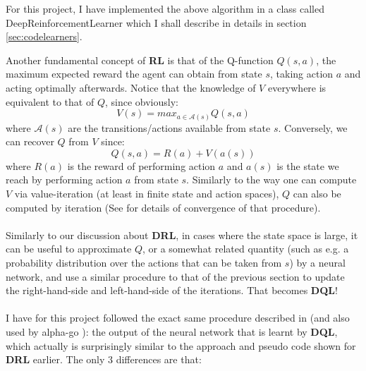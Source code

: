 For this project, I have implemented the above algorithm in a class called DeepReinforcementLearner which I shall describe in details in section \ref{sec:codelearners}.



\label{sec:TheoryDQL}
Another fundamental concept of \textbf{RL} is that of the Q-function $Q(s, a)$, the maximum expected reward the agent can obtain from state $s$, taking action $a$ and acting optimally afterwards. Notice that the knowledge of $V$ everywhere is equivalent to that of $Q$, since obviously:
\begin{equation} \label{eq:QI}
V(s) = max_{a \in \mathcal{A}(s)} Q(s, a)
\end{equation}
where $\mathcal{A}(s)$ are the transitions/actions available from state $s$. Conversely, we can recover $Q$ from $V$ since:
\begin{equation} \label{eq:QI2}
Q(s, a) = R(a) + V(a(s))
\end{equation}
where $R(a)$ is the reward of performing action $a$ and $a(s)$ is the state we reach by performing action $a$ from state $s$. Similarly to the way one can compute $V$ via value-iteration (at least in finite state and action spaces), $Q$ can also be computed by iteration (See \cite{Watkins1992} for details of convergence of that procedure).
\\
\\
Similarly to our discussion about \textbf{DRL}, in cases where the state space is large, it can be useful to approximate $Q$, or a somewhat related quantity (such as e.g. a probability distribution over the actions that can be taken from $s$) by a neural network, and use a similar procedure to that of the previous section to update the right-hand-side and left-hand-side of the iterations. That becomes \textbf{DQL}!
\\
\\
I have for this project followed the exact same procedure described in \cite{https://doi.org/10.48550/arxiv.1805.07470} (and also used by alpha-go \cite{AlphaGo}): the output of the neural network that is learnt by \textbf{DQL}, which actually is surprisingly similar to the approach and pseudo code shown for \textbf{DRL} earlier. The only 3 differences are that:
